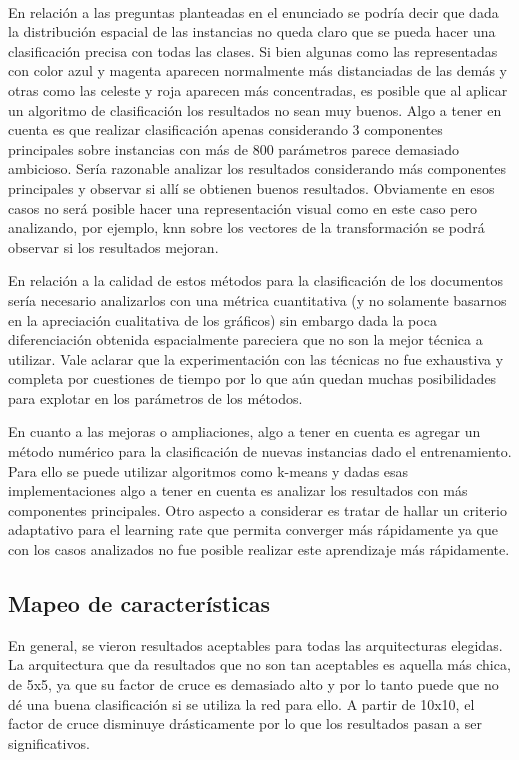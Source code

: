 \documentclass[informe.tex]{subfiles}
\begin{document}
      ~
      
      En relación a las preguntas planteadas en el enunciado se podría decir que dada la distribución espacial de las instancias no queda claro que se pueda hacer una clasificación precisa con todas las clases. Si bien algunas como las representadas con color azul y magenta aparecen normalmente más distanciadas de las demás y otras como las celeste y roja aparecen más concentradas, es posible que al aplicar un algoritmo de clasificación los resultados no sean muy buenos. Algo a tener en cuenta es que realizar clasificación apenas considerando 3 componentes principales sobre instancias con más de 800 parámetros parece demasiado ambicioso. Sería razonable analizar los resultados considerando más componentes principales y observar si all\'i se obtienen buenos resultados. Obviamente en esos casos no ser\'a posible hacer una representaci\'on visual como en este caso pero analizando, por ejemplo, knn sobre los vectores de la transformación se podr\'a observar si los resultados mejoran.
      
      En relación a la calidad de estos métodos para la clasificación de los documentos sería necesario analizarlos con una métrica cuantitativa (y no solamente basarnos en la apreciación cualitativa de los gráficos) sin embargo dada la poca diferenciación obtenida espacialmente pareciera que no son la mejor técnica a utilizar. Vale aclarar que la experimentación con las técnicas no fue exhaustiva y completa por cuestiones de tiempo por lo que aún quedan muchas posibilidades para explotar en los parámetros de los métodos.
      
      En cuanto a las mejoras o ampliaciones, algo a tener en cuenta es agregar un m\'etodo num\'erico para la clasificaci\'on de nuevas instancias dado el entrenamiento. Para ello se puede utilizar algoritmos como k-means y dadas esas implementaciones algo a tener en cuenta es analizar los resultados con más componentes principales. Otro aspecto a considerar es tratar de hallar un criterio adaptativo para el learning rate que permita converger más rápidamente ya que con los casos analizados no fue posible realizar este aprendizaje más rápidamente.
      
      
      
    \subsection{Mapeo de características}
    
    En general, se vieron resultados aceptables para todas las arquitecturas elegidas. La arquitectura que da resultados que no son tan aceptables es aquella más chica, de 5x5, ya que su factor de cruce es demasiado alto y por lo tanto puede que no dé una buena clasificaci\'on si se utiliza la red para ello. A partir de 10x10, el factor de cruce disminuye dr\'asticamente por lo que los resultados pasan a ser significativos.
    
\end{document}
